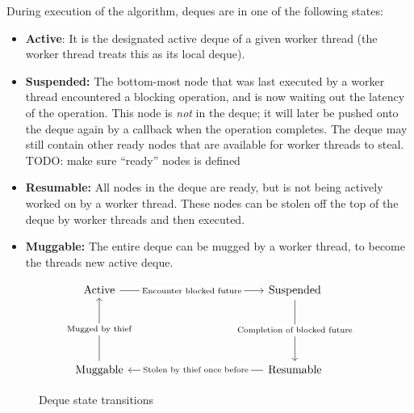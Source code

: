 \documentclass[bsc,frontabs,singlespacing,parskip,deptreport,normalheadings]{infthesis}
\begin{document}
During execution of the algorithm, deques are in one of the following states:

\begin{itemize}
    \item \textbf{Active}: It is the designated active deque of a given worker
        thread (the worker thread treats this as its local deque).
    \item \textbf{Suspended:} The bottom-most node that was last executed by a
        worker thread encountered a blocking operation, and is now waiting out
        the latency of the operation. This node is \textit{not} in the deque; it
        will later be pushed onto the deque again by a callback when the
        operation completes. The deque may still contain other ready nodes that
        are available for worker threads to steal. TODO: make sure ``ready''
        nodes is defined
    \item \textbf{Resumable:} All nodes in the deque are ready, but is not being
        actively worked on by a worker thread. These nodes can be stolen off the
        top of the deque by worker threads and then executed.
    \item \textbf{Muggable:} The entire deque can be mugged by a worker thread,
        to become the threads new active deque.
\end{itemize}

\begin{figure}[ht]
\[\begin{tikzcd}
	{\text{Active}} &&&&& {\text{Suspended}} \\
	\\
	\\
	{\text{Muggable}} &&&&& {\text{Resumable}}
	\arrow["{\text{Encounter blocked future}}"{description}, from=1-1, to=1-6]
	\arrow["{\text{Completion of blocked future}}"{description}, from=1-6, to=4-6]
	\arrow["{\text{Stolen by thief once before}}"{description}, from=4-6, to=4-1]
	\arrow["{\text{Mugged by thief}}"{description}, from=4-1, to=1-1]
\end{tikzcd}\]
\caption{Deque state transitions}
\label{figure:deque_state_transitions}
\end{figure}
\end{document}
